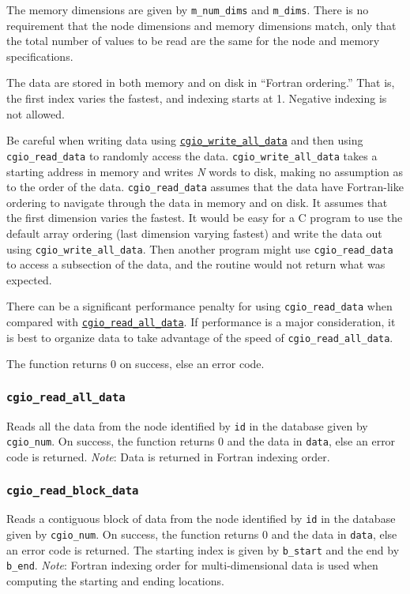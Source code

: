     \noindent
    The memory dimensions are given by \texttt{m\_num\_dims} and \texttt{m\_dims}.
    There is no requirement that the node dimensions and memory dimensions
    match, only that the total number of values to be read are the same
    for the node and memory specifications.

    \noindent
    The data are stored in both memory and on disk in ``Fortran ordering.''
    That is, the first index varies the fastest, and indexing starts at 1.
    Negative indexing is not allowed.

    \noindent
    Be careful when writing data using
    \hyperlink{write_all_data}{\texttt{cgio\_write\_all\_data}} and then using
    \texttt{cgio\_read\_data} to randomly access the data.
    \texttt{cgio\_write\_all\_data} takes a starting address in memory and
    writes \textit{N} words to disk, making no assumption as to the order of
    the data.
    \texttt{cgio\_read\_data} assumes that the data have Fortran-like
    ordering to navigate through the data in memory and on disk.
    It assumes that the first dimension varies the fastest.
    It would be easy for a C program to use the default array ordering
    (last dimension varying fastest) and write the data out using
    \texttt{cgio\_write\_all\_data}. Then another program might use
    \texttt{cgio\_read\_data} to access a subsection of the data, and the
    routine would not return what was expected.

    \noindent
    There can be a significant performance penalty for using
    \texttt{cgio\_read\_data} when compared with
    \hyperlink{read_all_data}{\texttt{cgio\_read\_all\_data}}.
    If performance is a major consideration, it is best to organize
    data to take advantage of the speed of \texttt{cgio\_read\_all\_data}.

    \noindent
    The function returns 0 on success, else an error code.

\subsubsection{\texttt{cgio\_read\_all\_data}} \label{read_all_data}
    \noindent
    Reads all the data from the node identified by \texttt{id} in the
    database given by \texttt{cgio\_num}. On success, the function
    returns 0 and the data in \texttt{data}, else an error code is returned.
    \textit{Note}: Data is returned in Fortran indexing order.

\subsubsection{\texttt{cgio\_read\_block\_data}} \label{read_block_data}
    \noindent
    Reads a contiguous block of data from the node identified by \texttt{id}
    in the database given by \texttt{cgio\_num}. On success, the function
    returns 0 and the data in \texttt{data}, else an error code is returned.
    The starting index is given by \texttt{b\_start} and the end by
    \texttt{b\_end}.
    \textit{Note}: Fortran indexing order for multi-dimensional data is used
    when computing the starting and ending locations.

